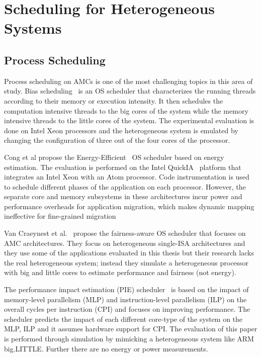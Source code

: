 \section{Scheduling for Heterogeneous Systems}
\label{sec.related.scheduling}



\subsection{Process Scheduling}
Process scheduling on AMCs is one of the most challenging topics in this area of study.
Bias scheduling~\cite{Koufaty_bias} is an OS scheduler that characterizes the running 
threads according to their memory or execution intensity. 
It then schedules the computation intensive threads to the big cores of the system while the memory intensive threads to the little cores of the system.
The experimental evaluation is done on Intel Xeon processors and the heterogeneous system is emulated by changing the configuration of three out of the four cores of the processor.

Cong et al propose the Energy-Efficient~\cite{Cong_quickIA} OS scheduler based on energy estimation. The evaluation is performed on the Intel QuickIA~\cite{quickIA} platform that integrates an Intel Xeon with an Atom processor. 
Code instrumentation is used to schedule different phases of the application on each processor. However, the separate core and memory subsystems in these architectures incur power and performance overheads for application migration, which makes dynamic mapping ineffective for fine-grained migration

Van Craeynest et al.~\cite{VanCraeynest_fairness} propose the fairness-aware OS scheduler that focuses on AMC architectures. 
They focus on heterogeneous single-ISA architectures and they use some of the applications evaluated in this thesis but their research lacks the real heterogeneous system; instead they simulate a heterogeneous processor with big and little cores to estimate performance and fairness (not energy).

The performance impact estimation (PIE) scheduler~\cite{VanCraeynest_PIE} is based on the impact of memory-level parallelism (MLP) and instruction-level parallelism (ILP) on the overall cycles per instruction (CPI) and focuses on improving performance.
The scheduler predicts the impact of each different core-type of the system on the MLP, ILP and it assumes hardware support for CPI. 
The evaluation of this paper is performed through simulation by mimicking a heterogeneous system like ARM big.LITTLE. 
Further there are no energy or power measurements.



